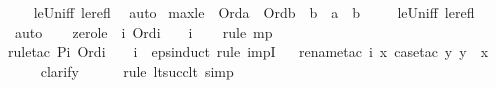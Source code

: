 \begin{isabellebody}
%
\isadelimproof
\ \ %
\endisadelimproof
%
\isatagproof
{}\isamarkupfalse%
\ le{\isacharunderscore}{\kern0pt}Un{\isacharunderscore}{\kern0pt}iff\ le{\isacharunderscore}{\kern0pt}refl\ \isamarkupfalse%
\ auto%
\endisatagproof
{\isafoldproof}%
%
\isadelimproof
%
\endisadelimproof
\isanewline
\isanewline
{}\isamarkupfalse%
\ max{\isacharunderscore}{\kern0pt}le{}\ {\isacharcolon}{\kern0pt}\ {\isachardoublequoteopen}Ord{\isacharparenleft}{\kern0pt}a{\isacharparenright}{\kern0pt}\ {\isasymLongrightarrow}\ Ord{\isacharparenleft}{\kern0pt}b{\isacharparenright}{\kern0pt}\ {\isasymLongrightarrow}\ b\ {\isasymle}\ a\ {\isasymunion}\ b{\isachardoublequoteclose}\ \isanewline
%
\isadelimproof
\ \ %
\endisadelimproof
%
\isatagproof
{}\isamarkupfalse%
\ le{\isacharunderscore}{\kern0pt}Un{\isacharunderscore}{\kern0pt}iff\ le{\isacharunderscore}{\kern0pt}refl\ \isamarkupfalse%
\ auto%
\endisatagproof
{\isafoldproof}%
%
\isadelimproof
%
\endisadelimproof
\ \ \isanewline
\isanewline
{}\isamarkupfalse%
\ zero{\isacharunderscore}{\kern0pt}le\ {\isacharcolon}{\kern0pt}\ {\isachardoublequoteopen}{\isasymAnd}i{\isachardot}{\kern0pt}\ Ord{\isacharparenleft}{\kern0pt}i{\isacharparenright}{\kern0pt}\ {\isasymLongrightarrow}\ {}\ {\isasymle}\ i{\isachardoublequoteclose}\ \isanewline
%
\isadelimproof
\ \ %
\endisadelimproof
%
\isatagproof
{}\isamarkupfalse%
{\isacharparenleft}{\kern0pt}rule\ mp{\isacharparenright}{\kern0pt}\isanewline
\ \ \isamarkupfalse%
{\isacharparenleft}{\kern0pt}rule{\isacharunderscore}{\kern0pt}tac\ P{\isacharequal}{\kern0pt}{\isachardoublequoteopen}{\isasymlambda}i{\isachardot}{\kern0pt}\ Ord{\isacharparenleft}{\kern0pt}i{\isacharparenright}{\kern0pt}\ {\isasymlongrightarrow}\ {}\ {\isasymle}\ i{\isachardoublequoteclose}\ \ eps{\isacharunderscore}{\kern0pt}induct{\isacharcomma}{\kern0pt}\ rule\ impI{\isacharparenright}{\kern0pt}\isanewline
\ \ \isamarkupfalse%
{\isacharparenleft}{\kern0pt}rename{\isacharunderscore}{\kern0pt}tac\ i\ x{\isacharcomma}{\kern0pt}\ case{\isacharunderscore}{\kern0pt}tac\ {\isachardoublequoteopen}{\isasymexists}y{\isachardot}{\kern0pt}\ y\ {\isasymin}\ x{\isachardoublequoteclose}{\isacharparenright}{\kern0pt}\isanewline
\ \ \ \isamarkupfalse%
\ clarify\ \isanewline
\ \ \ \ \isamarkupfalse%
{\isacharparenleft}{\kern0pt}rule\ lt{\isacharunderscore}{\kern0pt}succ{\isacharunderscore}{\kern0pt}lt{\isacharcomma}{\kern0pt}\ simp{\isacharparenright}{\kern0pt}\isanewline

\end{isabellebody}
